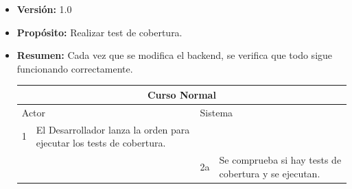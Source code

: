 \begin{itemize}
\begin{itemize}
    \item \textbf{Versión:} 1.0
    \item \textbf{Propósito:} Realizar test de cobertura.
    \item \textbf{Resumen:} Cada vez que se modifica el backend, se verifica que todo sigue funcionando correctamente.
    \begin{table}[H]
      \centering
      \begin{tabularx}{\textwidth}{|l|X|l|X|}
        \hline
        \multicolumn{4}{|c|}{\cellcolor[HTML]{C0C0C0}Curso Normal}                                                 \\ \hline
        \multicolumn{2}{|l|}{\cellcolor[HTML]{EFEFEF}Actor} & \multicolumn{2}{l|}{\cellcolor[HTML]{EFEFEF}Sistema} \\ \hline
        1                         & El Desarrollador lanza la orden para ejecutar los tests de cobertura.                        &                            &                         \\ \hline
                                  &                         & 2a                          & Se comprueba si hay tests de cobertura y se ejecutan.                       \\ \hline


\end{tabularx}
\end{table}
\end{itemize}
\end{itemize}
